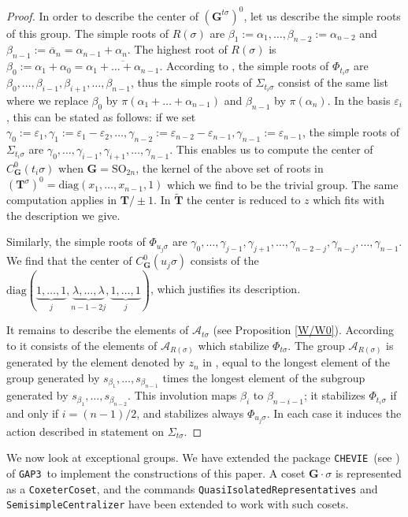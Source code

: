 \documentclass{amsart}
\numberwithin{equation}{section}
\theoremstyle{definition}
\theoremstyle{remark}
\newcommand\bG{{\mathbf G}}
\newcommand\bT{{\mathbf T}}
\newcommand\CA{{\mathcal A}}
\newcommand\Gtso{{(\bG^{t\sigma})^0}}
\newcommand\Tso{{(\bT^\sigma)^0}}
\newcommand\ve{{\varepsilon}}
\newcommand\SO{\mathrm{SO}}
\newcommand\diag{\mathrm{diag}}
\newcommand\CHEVIE{{\tt CHEVIE}}
\newcommand\GAP{{\tt GAP3}}
\begin{document}
\begin{proof}
In order to describe the center of $\Gtso$, let us describe the simple roots
of this group. The simple roots of $R(\sigma)$ are
$\beta_1:=\alpha_1,\ldots,\beta_{n-2}:=\alpha_{n-2}$ and 
$\beta_{n-1}:=\overline\alpha_n=\alpha_{n-1}+\alpha_n$. The highest root
of $R(\sigma)$ is
$\beta_0:=\alpha_1+\alpha_0=\overline{\alpha_1+\ldots+\alpha_{n-1}}$. 
According to \cite[corollary 5.4]{cedric}, 
the simple roots of $\Phi_{t_i\sigma}$ are 
$\beta_0,\ldots,\beta_{i-1},\beta_{i+1},\ldots,\beta_{n-1}$, thus
the simple roots of $\Sigma_{t_i\sigma}$ consist of the same list where we
replace $\beta_0$ by $\pi(\alpha_1+\ldots+\alpha_{n-1})$ and $\beta_{n-1}$
by $\pi(\alpha_n)$. In the basis $\ve_i$, this can be stated as follows:
if we set
$\gamma_0:=\ve_1,\gamma_1:=\ve_1-\ve_2,\ldots,\gamma_{n-2}:=\ve_{n-2}-\ve_{n-1},
\gamma_{n-1}:=\ve_{n-1}$, the simple roots of $\Sigma_{t_i\sigma}$ are
$\gamma_0,\ldots,\gamma_{i-1},\gamma_{i+1},\ldots,\gamma_{n-1}$.
This enables us to compute the center of $C_\bG^0(t_i\sigma)$ when
$\bG=\SO_{2n}$,  the kernel of the above set of roots in $\Tso=
\diag(x_1,\ldots,x_{n-1},1)$ which we find to be the trivial group. The same
computation applies in $\bT/\pm 1$. In $\tilde\bT$ the center is reduced to
$z$ which fits with the description we give.

Similarly, the simple roots of $\Phi_{u_j\sigma}$ are
$\gamma_0,\ldots,\gamma_{j-1},\allowbreak\gamma_{j+1},\ldots,
\gamma_{n-2-j},\allowbreak\gamma_{n-j},\ldots,\gamma_{n-1}$. We find that
the center of $C_\bG^0(u_j\sigma)$ consists of the
$\diag(\underbrace{1,\ldots,1}_j,\underbrace{\lambda,\ldots,\lambda}_{n-1-2j},
\underbrace{1,\ldots,1}_j)$, which justifies its description.

It  remains to  describe the  elements of  $\CA_{t\sigma}$ (see Proposition
\ref{W/W0}).   According   to   \cite[Theorem  4.4(b)($\beta$)]{cedric}  it
consists   of   the   elements   of   $\CA_{R(\sigma)}$   which   stabilize
$\Phi_{t\sigma}$.  The group  $\CA_{R(\sigma)}$ is  generated by the element
denoted by $z_n$ in \cite[table  1]{cedric}, equal to  the longest element of
the  group  generated  by  $s_{\beta_1},\ldots,s_{\beta_{n-1}}$  times  the
longest  element of the subgroup generated by 
$s_{\beta_1},\ldots,s_{\beta_{n-2}}$. This
involution maps $\beta_i$ to $\beta_{n-i-1}$; it stabilizes
$\Phi_{t_i\sigma}$ if and only  if  $i=(n-1)/2$,    and   stabilizes   always
$\Phi_{u_j\sigma}$.  In  each  case  it  induces  the  action  described in
statement on $\Sigma_{t\sigma}$.
\end{proof}
We now look at exceptional groups.
We have extended the package \CHEVIE\ (see \cite{chevie})
of \GAP\ to implement the constructions
of this paper. A coset $\bG\cdot\sigma$ is represented as a
\verb+CoxeterCoset+, and the commands \verb+QuasiIsolatedRepresentatives+
and \verb+SemisimpleCentralizer+ have been extended to work with such cosets.
\end{document}
